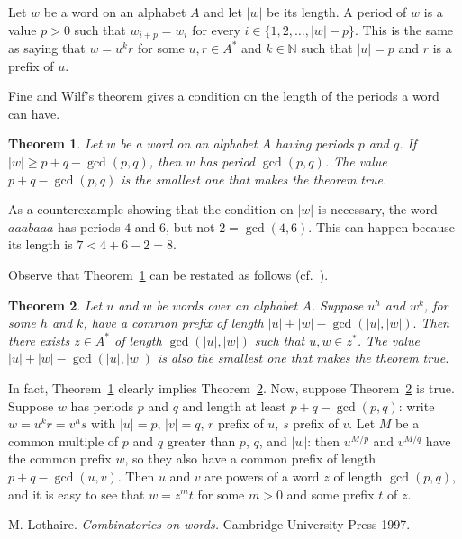 \documentclass[12pt]{article}
\newcommand{\naturals}{\ensuremath{\mathbb{N}}}
\newtheorem{theorem}{Theorem}
\begin{document}
Let $w$ be a word on an alphabet $A$ and let $|w|$ be its length.
A period of $w$ is a value $p>0$
such that $w_{i+p}=w_{i}$ for every $i\in\{1,2,\ldots,|w|-p\}$.
This is the same as saying that $w=u^{k}r$
for some $u,r\in A^{\ast}$ and $k\in\naturals$
such that $|u|=p$ and $r$ is a prefix of $u$.

Fine and Wilf's theorem
gives a condition on the length of the periods a word can have.
\begin{theorem} \label{thm:fw}
Let $w$ be a word on an alphabet $A$ having periods $p$ and $q$.
If $|w|\geq p+q-\gcd(p,q)$,
then $w$ has period $\gcd(p,q)$.
The value $p+q-\gcd(p,q)$
is the smallest one that makes the theorem true.
\end{theorem}

As a counterexample showing that the condition on $|w|$ is necessary,
the word $aaabaaa$ has periods $4$ and $6$, but not $2=\gcd(4,6)$.
This can happen because its length is $7<4+6-2=8$.

Observe that Theorem~\ref{thm:fw} can be restated as follows
(cf.~\cite{l97}).
\begin{theorem} \label{thm:fw-alt}
Let $u$ and $w$ be words over an alphabet $A$.
Suppose $u^h$ and $w^k$, for some $h$ and $k$,
have a common prefix of length
\begin{math}
|u|+|w|-\gcd(|u|,|w|).
\end{math}
Then there exists $z\in A^\ast$ of length $\gcd(|u|,|w|)$
such that $u,w\in z^\ast$.
The value
\begin{math}
|u|+|w|-\gcd(|u|,|w|)
\end{math}
is also the smallest one that makes the theorem true.
\end{theorem}

In fact, Theorem~\ref{thm:fw} clearly implies Theorem~\ref{thm:fw-alt}.
Now, suppose Theorem~\ref{thm:fw-alt} is true.
Suppose $w$ has periods $p$ and $q$
and length at least $p+q-\gcd(p,q)$:
write $w=u^{k}r=v^{h}s$ with
$|u|=p$, $|v|=q$, $r$ prefix of $u$, $s$ prefix of $v$.
Let $M$ be a common multiple of $p$ and $q$ greater than $p$, $q$, and $|w|$:
then $u^{M/p}$ and $v^{M/q}$ have the common prefix $w$,
so they also have a common prefix of length $p+q-\gcd(u,v)$.
Then $u$ and $v$ are powers of a word $z$ of length $\gcd(p,q)$,
and it is easy to see that $w=z^{m}t$
for some $m>0$ and some prefix $t$ of $z$.

\begin{thebibliography}{99}

M. Lothaire.
\textit{Combinatorics on words.}
Cambridge University Press 1997.

\end{thebibliography}

\end{document}

